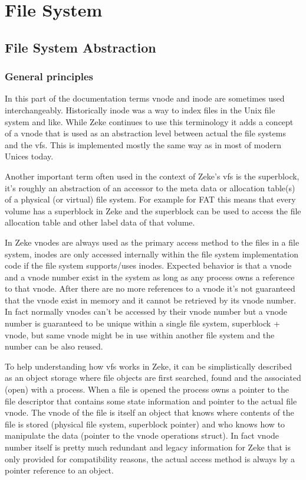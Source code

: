\part{File System}

\chapter{File System Abstraction}

\section{General principles}

In this part of the documentation terms \acs{vnode} and \acs{inode} are
sometimes used interchangeably. Historically inode was a way to index files
in the Unix file system and like.\cite{Wikipedia:inode} While Zeke continues
to use this terminology it adds a concept of a vnode that is used as an
abstraction level between actual the file systems and the \acf{vfs}. This
is implemented mostly the same way as in most of modern Unices today.

Another important term often used in the context of Zeke's \acs{vfs}
is the superblock, it's roughly an abstraction of an accessor to the meta
data or allocation table(s) of a physical (or virtual) file system. For example
for FAT this means that every volume has a superblock in Zeke and the superblock
can be used to access the file allocation table and other label data of that
volume.

In Zeke vnodes are always used as the primary access method to the files in
a file system, inodes are only accessed internally within the file system
implementation code if the file system supports/uses inodes. Expected behavior
is that a vnode and a vnode number exist in the system as long as any process
owns a reference to that vnode. After there are no more references to a vnode
it's not guaranteed that the vnode exist in memory and it cannot be retrieved
by its vnode number. In fact normally vnodes can't be accessed by their vnode
number but a vnode number is guaranteed to be unique within a single file
system, superblock + vnode, but same vnode might be in use within another file
system and the number can be also reused.

To help understanding how \acs{vfs} works in Zeke, it can be simplistically
described as an object storage where file objects are first searched, found and
the associated (open) with a process. When a file is opened the process owns a
pointer to the file descriptor that contains some state information and pointer
to the actual file vnode. The vnode of the file is itself an object that knows
where contents of the file is stored (physical file system, superblock pointer)
and who knows how to manipulate the data (pointer to the vnode operations struct).
In fact vnode number itself is pretty much redundant and legacy information for
Zeke that is only provided for compatibility reasons, the actual access method
is always by a pointer reference to an object.

